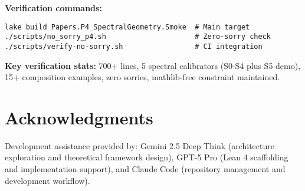 \documentclass[11pt]{article}
\theoremstyle{plain}
\theoremstyle{definition}
\theoremstyle{remark}
\begin{document}
\textbf{Verification commands:}
\begin{verbatim}
lake build Papers.P4_SpectralGeometry.Smoke  # Main target
./scripts/no_sorry_p4.sh                     # Zero-sorry check
./scripts/verify-no-sorry.sh                 # CI integration
\end{verbatim}

\textbf{Key verification stats:} 700+ lines, 5 spectral calibrators (S0-S4 plus S5 demo), 15+ composition examples, zero sorries, mathlib-free constraint maintained.


\section*{Acknowledgments}
Development assistance provided by: Gemini 2.5 Deep Think (architecture exploration and theoretical framework design), GPT-5 Pro (Lean 4 scaffolding and implementation support), and Claude Code (repository management and development workflow).
\end{document}
